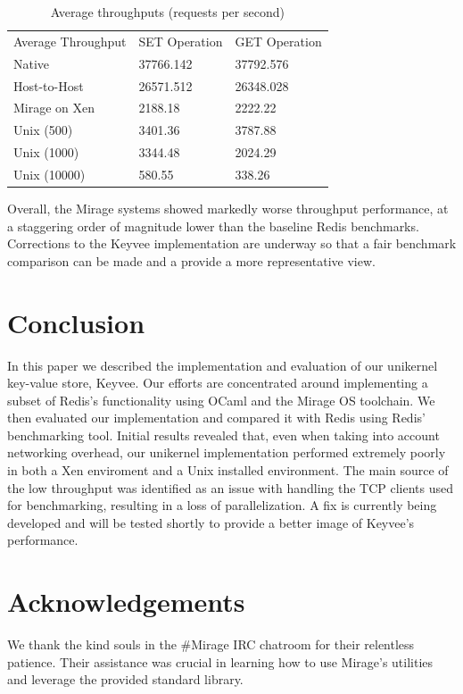 \documentclass[english,10pt,twocolumn]{article}
\begin{document}
\begin{table}[h]
\begin{tabular}{lll}
Average Throughput & SET Operation & GET Operation \\
Native & 37766.142 & 37792.576 \\
Host-to-Host & 26571.512 & 26348.028 \\
Mirage on Xen & 2188.18 & 2222.22 \\
Unix (500) & 3401.36 & 3787.88 \\
Unix (1000) & 3344.48 & 2024.29 \\
Unix (10000) & 580.55 & 338.26
\end{tabular}
\caption{Average throughputs (requests per second)}
\label{my-label}
\end{table}

Overall, the Mirage systems showed markedly worse throughput performance, at a staggering order of magnitude lower than the baseline Redis benchmarks.
Corrections to the Keyvee implementation are underway so that a fair benchmark comparison can be made and a provide a more representative view.

\section{Conclusion}
In this paper we described the implementation and evaluation of our unikernel key-value store, Keyvee. Our efforts are concentrated around implementing a subset of Redis's functionality using OCaml and the Mirage OS toolchain. We then evaluated our implementation and compared it with Redis using Redis' benchmarking tool. Initial results revealed that, even when taking into account networking overhead, our unikernel implementation performed extremely poorly in both a Xen enviroment and a Unix installed environment. The main source of the low throughput was identified as an issue with handling the TCP clients used for benchmarking, resulting in a loss of parallelization. A fix is currently being developed and will be tested shortly to provide a better image of Keyvee's performance.


\section{Acknowledgements}
We thank the kind souls in the \#Mirage IRC chatroom for their relentless patience.
Their assistance was crucial in learning how to use Mirage's utilities and leverage the provided standard library.





\end{document}
